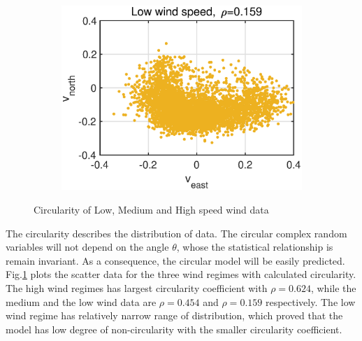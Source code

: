 \begin{figure}[htb]
\begin{subfigure}[b]{0.3\textwidth}
    \end{subfigure}  
    \hspace{0.4cm}
    \begin{subfigure}[b]{0.3\textwidth}
     \centering
     \includegraphics[width=1.2\textwidth]{fig/31/31b3.eps}
    \end{subfigure}  
    \caption{Circularity of Low, Medium and High speed wind data}
    \label{fig:3_1_b1}
\end{figure}
\noindent
The circularity describes the distribution of data. The circular complex random variables will not depend on the angle $\theta$, whose the statistical relationship is remain invariant. As a consequence, the circular model will be easily predicted. Fig.\ref{fig:3_1_b1} plots the scatter data for the three wind regimes with calculated circularity. The high wind regimes has largest circularity coefficient with $\rho=0.624$, while the medium and the low wind data are $\rho=0.454$ and $\rho=0.159$ respectively. The low wind regime has relatively narrow range of distribution, which proved that the model has low degree of non-circularity with the smaller circularity coefficient.
